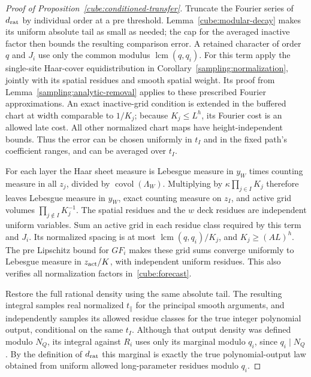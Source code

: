 \begin{proof}[Proof of Proposition~\ref{cube:conditioned-transfer}]
Truncate the Fourier series of $d_{\rm rat}$ by individual order
at a pre threshold.  Lemma~\ref{cube:modular-decay} makes its
uniform absolute tail as small as needed; the cap for the averaged
inactive factor then bounds the resulting comparison error.  A
retained character of order $q$ and $J_i$ use only the common
modulus $\operatorname{lcm}(q,q_i)$.  For this term apply the
single-site Haar-cover equidistribution in
Corollary~\ref{sampling:normalization}, jointly with its spatial
residues and smooth spatial weight.  Its proof from
Lemma~\ref{sampling:analytic-removal} applies to these prescribed
Fourier approximations.  An exact inactive-grid condition is
extended in the buffered chart at width comparable to $1/K_j$;
because $K_j\le L^h$, its Fourier cost is an allowed late cost.
All other normalized chart maps have height-independent bounds.
Thus the error can be chosen uniformly in $t_I$ and in the fixed
path's coefficient ranges, and can be averaged over $t_I$.

For each layer the Haar sheet measure is Lebesgue measure in $y_W$
times counting measure in all $z_j$, divided by
$\operatorname{covol}(\Lambda_W)$.  Multiplying by
$\kappa\prod_{j\in I}K_j$ therefore leaves Lebesgue measure in
$y_W$, exact counting measure on $z_I$, and active grid volumes
$\prod_{j\notin I}K_j^{-1}$.  The spatial residues and the $w$
deck residues are independent uniform variables.  Sum an active
grid in each residue class required by this term and $J_i$.
Its normalized spacing is at most
$\operatorname{lcm}(q,q_i)/K_j$, and $K_j\ge(AL)^h$.
The pre Lipschitz bound for $G F_i$ makes these grid sums converge
uniformly to Lebesgue measure in $z_{\rm act}/K$, with independent
uniform residues.  This also verifies all normalization factors
in~\eqref{cube:forecast}.

Restore the full rational density using the same absolute tail.
The resulting integral samples real normalized $t_\parallel$ for
the principal smooth arguments, and independently samples its
allowed residue classes for the true integer polynomial output,
conditional on the same $t_I$.  Although that output density was
defined modulo $N_Q$, its integral against $R_i$ uses only its
marginal modulo $q_i$, since $q_i\mid N_Q$.  By the definition of
$d_{\rm rat}$ this marginal is exactly the true polynomial-output
law obtained from uniform allowed long-parameter residues modulo
$q_i$.


\end{proof}
